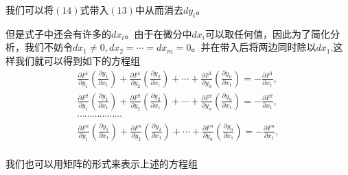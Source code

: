 \documentclass[UTF8,12pt]{ctexart}
\numberwithin{equation}{section} %
\numberwithin{figure}{section}
\numberwithin{table}{section}
\begin{document}
	我们可以将$(14)$式带入$(13)$中从而消去$dy_i$。
	
	但是式子中还会有许多的$dx_i$。由于在微分中$dx_i$可以取任何值，因此为了简化分析，我们不妨令$dx_1 \neq 0,dx_2 = \cdots = dx_m = 0$。并在带入后将两边同时除以$dx_1$.这样我们就可以得到如下的方程组
	\begin{equation}
		\begin{aligned}
			\frac{\partial F^1}{\partial y_1}\left(\frac{\partial y_1}{\partial x_1}\right) + 
			\frac{\partial F^1}{\partial y_2}\left(\frac{\partial y_2}{\partial x_1}\right) + 
			\cdots +
			\frac{\partial F^1}{\partial y_n}\left(\frac{\partial y_n}{\partial x_1}\right) = -\frac{\partial F^1}{\partial x_1}, \\
			\frac{\partial F^2}{\partial y_1}\left(\frac{\partial y_1}{\partial x_1}\right) + 
			\frac{\partial F^2}{\partial y_2}\left(\frac{\partial y_2}{\partial x_1}\right) + 
			\cdots +
			\frac{\partial F^2}{\partial y_n}\left(\frac{\partial y_n}{\partial x_1}\right) = -\frac{\partial F^2}{\partial x_1}, \\
			\cdots \cdots \cdots \cdots \cdots \cdots \\
			\frac{\partial F^n}{\partial y_1}\left(\frac{\partial y_1}{\partial x_1}\right) + 
			\frac{\partial F^n}{\partial y_2}\left(\frac{\partial y_2}{\partial x_1}\right) + 
			\cdots +
			\frac{\partial F^n}{\partial y_n}\left(\frac{\partial y_n}{\partial x_1}\right) = -\frac{\partial F^n}{\partial x_1}, \\
		\end{aligned}
	\end{equation}
	
	我们也可以用矩阵的形式来表示上述的方程组
	
\end{document}

